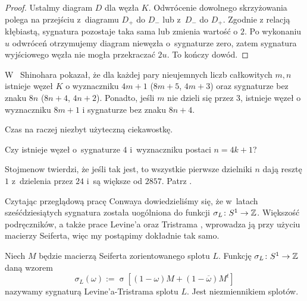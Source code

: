 \begin{proof}
    Ustalmy diagram $D$ dla węzła $K$.
    Odwrócenie dowolnego skrzyżowania polega na przejściu z~diagramu $D_+$ do $D_-$ lub z~$D_-$ do $D_+$.
    Zgodnie z relacją kłębiastą, sygnatura pozostaje taka sama lub zmienia wartość o $2$.
    Po wykonaniu $u$ odwróceń otrzymujemy diagram niewęzła o~sygnaturze zero, zatem sygnatura wyjściowego węzła nie mogła przekraczać $2u$.
    To kończy dowód.
\end{proof}

W~\cite{shinohara1971} Shinohara pokazał, że dla każdej pary nieujemnych liczb całkowitych $m, n$ istnieje węzeł $K$ o wyznaczniku $4m+1$ ($8m+5$, $4m+3$) oraz sygnaturze bez znaku $8n$ ($8n+4$, $4n+2$).
%
%
Ponadto, jeśli $m$ nie dzieli się przez $3$, istnieje węzeł o wyznaczniku $8m+1$ i sygnaturze bez znaku $8n+4$.

Czas na raczej niezbyt użyteczną ciekawostkę.

\begin{conjecture}
    Czy istnieje węzeł o~sygnaturze $4$ i~wyznaczniku postaci $n = 4k + 1$?
\end{conjecture}

Stojmenow twierdzi, że jeśli tak jest, to wszystkie pierwsze dzielniki $n$ dają resztę $1$ z~dzielenia przez $24$ i~są większe od $2857$.
%
Patrz \cite[s. 540]{ohtsuki2002}.

Czytając przeglądową pracę Conwaya \cite{conway2019} dowiedzieliśmy się, że w~latach sześćdziesiątych sygnatura została uogólniona do funkcji $\sigma_L \colon S^1 \to \mathbb Z$.
%
Większość podręczników, a także prace Levine'a \cite{levine1969} oraz Tristrama \cite{tristram1969}, wprowadza ją przy użyciu macierzy Seiferta, więc my postąpimy dokładnie tak samo.
%
%

\begin{definition}
%
    Niech $M$ będzie macierzą Seiferta zorientowanego splotu $L$.
    Funkcję $\sigma_L \colon S^1 \to \mathbb Z$ daną wzorem
    \begin{equation}
        \sigma_L(\omega) := \operatorname{\sigma} [(1-\omega) M + (1 - \overline{\omega})M^t]
    \end{equation}
    nazywamy sygnaturą Levine'a-Tristrama splotu $L$.
    Jest niezmiennikiem splotów.
\end{definition}

